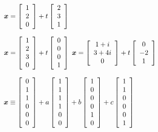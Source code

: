 \begin{enumerate}[!HW!, start=1]
\begin{multicols}{2}
\itemspade $\bb x = \vr{1\\2\\0} + t\vr{2\\3\\1}$
\end{multicols}
\begin{multicols}{2}
\itemspade $\bb x = \vr{1\\2\\3\\0} + t\vr{0\\0\\0\\1}$
\itemspade $\bb x = \mtx{c}{1+i\\3+4i\\0} + t\mtx{c}{0\\-2\\1}$
\end{multicols}
\itemspade $\bb x\equiv \vr{0\\1\\1\\0\\0\\0} + a\vr{1\\1\\1\\1\\0\\0}+b\vr{1\\0\\0\\0\\1\\0}+c\vr{1\\1\\0\\0\\0\\1}$



\end{enumerate}
